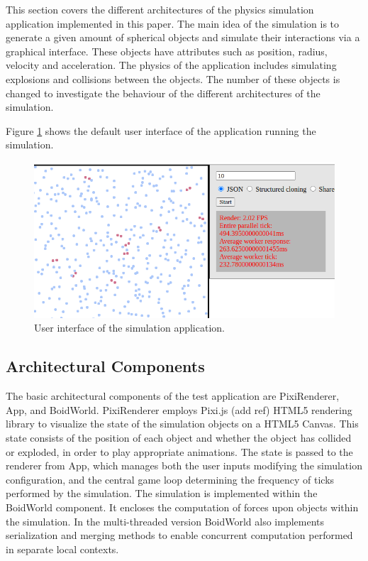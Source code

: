 \documentclass[conference, 9pt]{IEEEtran}
\begin{document}
This section covers the different architectures of the physics simulation application implemented in this paper. The main idea of the simulation is to generate a given amount
of spherical objects and simulate their interactions via a graphical interface. These objects have attributes such as position, radius, velocity and acceleration. The 
physics of the application includes simulating explosions and collisions between the objects. The number of these objects is changed to investigate the behaviour
of the different architectures of the simulation.

Figure \ref{fig:figure2} shows the default user interface of the application running the simulation.

\begin{figure}[ht]
	\centering
	\includegraphics[scale=0.5]{figs/figure2.png}
	\caption{User interface of the simulation application.}
	\label{fig:figure2}
\end{figure}

\subsection{Architectural Components}
\label{sec:basic}

The basic architectural components of the test application are PixiRenderer, App, and BoidWorld. PixiRenderer employs Pixi.js (add ref) HTML5 rendering library to visualize the state of the simulation objects on a HTML5 Canvas. This state consists of the position of each object and whether the object has collided or exploded, in order to play appropriate animations. The state is passed to the renderer from App, which manages both the user inputs modifying the simulation configuration, and the central game loop determining the frequency of ticks performed by the simulation. The simulation is implemented within the BoidWorld component. It encloses the computation of forces upon objects within the simulation. In the multi-threaded version BoidWorld also implements serialization and merging methods to enable concurrent computation performed in separate local contexts.
\end{document}
